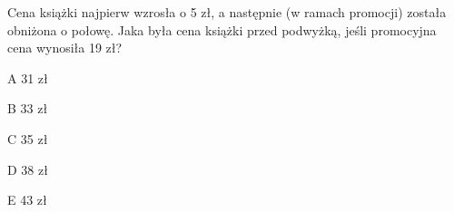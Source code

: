 \begin{tresc}
Cena książki najpierw wzrosła o 5 zł, a następnie (w ramach promocji) została obniżona o połowę. Jaka była cena książki przed podwyżką, jeśli promocyjna cena wynosiła 19 zł?
\end{tresc}
\begin{wariant}{A} 31 zł \end{wariant}
\begin{wariant}{B} 33 zł \end{wariant}
\begin{wariant}{C} 35 zł \end{wariant}
\begin{wariant}{D} 38 zł \end{wariant}
\begin{wariant}{E} 43 zł \end{wariant}
